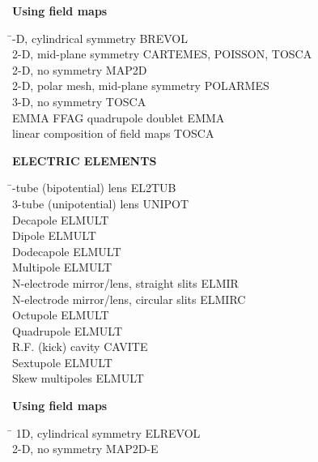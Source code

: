 \smallskip

\noindent\textbf{Using field maps}  

\begin{tabbing}
\hspace*{7cm} \= -D, cylindrical symmetry \> BREVOL \\
  2-D, mid-plane symmetry   \> CARTEMES, POISSON, TOSCA \\
  2-D, no symmetry          \> MAP2D \\
  2-D, polar mesh, mid-plane symmetry          \> POLARMES \\
  3-D, no symmetry          \> TOSCA \\
  EMMA FFAG quadrupole doublet       \> EMMA \\
  linear composition of field maps \> TOSCA 
\end{tabbing}

\bigskip

\bigskip

\noindent\textbf{ELECTRIC ELEMENTS}  

\begin{tabbing}
\hspace*{7cm} \= -tube (bipotential) lens \> EL2TUB \\
  3-tube (unipotential) lens \> UNIPOT \\
  Decapole                \> ELMULT \\
  Dipole                  \> ELMULT \\
  Dodecapole              \> ELMULT \\
  Multipole               \> ELMULT \\
  N-electrode mirror/lens, straight slits            \> ELMIR \\
  N-electrode mirror/lens, circular slits            \> ELMIRC \\
  Octupole                \> ELMULT \\
  Quadrupole              \> ELMULT \\
  R.F. (kick) cavity             \> CAVITE \\
  Sextupole               \> ELMULT \\
  Skew multipoles       \> ELMULT 
\end{tabbing}

\smallskip

\noindent\textbf{Using field maps} 

\begin{tabbing}
\hspace*{7cm} \= \kill
 1D, cylindrical symmetry  \> ELREVOL  \\
  2-D, no symmetry          \> MAP2D-E 
\end{tabbing}


